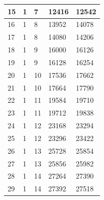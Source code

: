 \documentclass{article}
\begin{document}
\begin{table}[H]
\begin{center}
\begin{tabular}{| p{1cm} | p{1.75cm} | p{1.75cm} | p{1.75cm} | p{1.75cm} |}
                        \hline
                        15 & 1 & 7 & 12416 & 12542 \\
                        \hline
                        16 & 1 & 8 & 13952 & 14078 \\
                        \hline
                        17 & 1 & 8 & 14080 & 14206 \\
                        \hline
                        18 & 1 & 9 & 16000 & 16126 \\
                        \hline
                        19 & 1 & 9 & 16128 & 16254 \\
                        \hline
                        20 & 1 & 10 & 17536 & 17662 \\
                        \hline
                        21 & 1 & 10 & 17664 & 17790 \\
                        \hline
                        22 & 1 & 11 & 19584 & 19710 \\
                        \hline
                        23 & 1 & 11 & 19712 & 19838 \\
                        \hline
                        24 & 1 & 12 & 23168 & 23294 \\
                        \hline
                        25 & 1 & 12 & 23296 & 23422 \\
                        \hline
                        26 & 1 & 13 & 25728 & 25854 \\
                        \hline
                        27 & 1 & 13 & 25856 & 25982 \\
                        \hline
                        28 & 1 & 14 & 27264 & 27390 \\
                        \hline
                        29 & 1 & 14 & 27392 & 27518 \\
                        \hline
                    \end{tabular}
                \end{center}
            \end{table}
\end{document}
